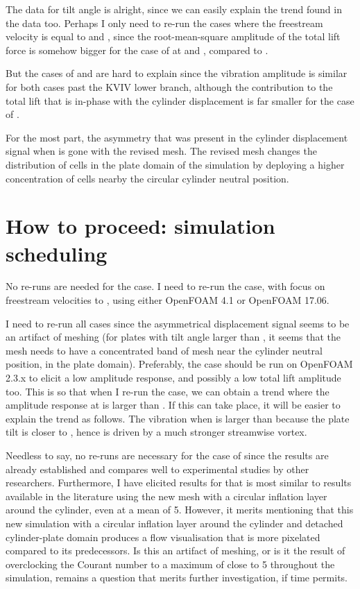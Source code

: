 \documentclass[a4paper]{article}
\begin{document}
The data for tilt angle \ron{} is alright, since we can easily explain the trend found in the data too. Perhaps I only need to re-run the cases where the freestream velocity is equal to \uni{} and \ute{}, since the root-mean-square amplitude of the total lift force is somehow bigger for the case of \ron{} at \uni{} and \ute{}, compared to \rze{}.

But the cases of \rtw{} and \rth{} are hard to explain since the vibration amplitude is similar for both cases past the KVIV lower branch, although the contribution to the total lift that is in-phase with the cylinder displacement is far smaller for the case of \rtw{}.

For the most part, the asymmetry that was present in the cylinder displacement signal when \rtw{} is gone with the revised mesh. The revised mesh changes the distribution of cells in the plate domain of the simulation by deploying a higher concentration of cells nearby the circular cylinder neutral position.

\section*{How to proceed: simulation scheduling}\label{howProceed}
No re-runs are needed for the \rze{} case. I need to re-run the \ron{} case, with focus on freestream velocities \uni{} to \utt{}, using either OpenFOAM 4.1 or OpenFOAM 17.06.

I need to re-run all \rtw{} cases since the asymmetrical displacement signal seems to be an artifact of meshing (for plates with tilt angle larger than \rtw{}, it seems that the mesh needs to have a concentrated band of mesh near the cylinder neutral position, in the plate domain). Preferably, the \rtw{} case should be run on OpenFOAM 2.3.x to elicit a low amplitude response, and possibly a low total lift amplitude too. This is so that when I re-run the \rth{} case, we can obtain a trend where the amplitude response at \rth{} is larger than \rtw{}. If this can take place, it will be easier to explain the trend as follows. The vibration when \rth{} is larger than \rtw{} because the plate tilt is closer to \rfo{}, hence is driven by a much stronger streamwise vortex.

Needless to say, no re-runs are necessary for the case of \rfo{} since the results are already established and compares well to experimental studies by other researchers. Furthermore, I have elicited results for \rfo{} that is most similar to results available in the literature using the new mesh with a circular inflation layer around the cylinder, even at a \ypl{} mean of 5. However, it merits mentioning that this new \rfo{} simulation with a circular inflation layer around the cylinder and detached cylinder-plate domain produces a flow visualisation that is more pixelated compared to its predecessors. Is this an artifact of meshing, or is it the result of overclocking the Courant number to a maximum of close to 5 throughout the simulation, remains a question that merits further investigation, if time permits.
\end{document}
